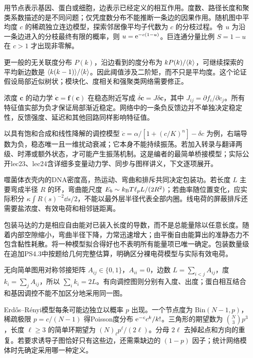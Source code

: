 用节点表示基因、蛋白或细胞，边表示已经定义的相互作用。度数、路径长度和聚类系数描述的是不同问题；仅凭度数分布不能推断一条边的因果作用。随机图中平均度 $c$ 的稀疏独立连边模型，探索邻居像平均子代数为 $c$ 的分枝过程。令 $u$ 为沿一条边进入的分枝最终有限的概率，则 $u=\mathrm e^{-c(1-u)}$。巨连通分量比例 $S=1-u$ 在 $c>1$ 才出现非零解。

更一般的无关联度分布 $P(k)$，沿边看到的度分布为 $kP(k)/\langle k\rangle$，可继续探索的平均新边数是 $\langle k(k-1)\rangle/\langle k\rangle$。因此阈值涉及二阶矩，而不只是平均度。这个论证假设局部近似树状；模块化、度相关和强聚类网络需要修正。

浓度 $\mathbf c$ 的动力学 $\dot{\mathbf c}=\mathbf f(\mathbf c)$ 在稳态附近写成 $\dot{\delta\mathbf c}=J\delta\mathbf c$，其中 $J_{ij}=\partial f_i/\partial c_j$。所有特征值实部为负才保证局部渐近稳定。网络中的一条负反馈边并不单独决定稳定性，反馈强度、延迟和其他回路同样影响特征值。

以具有饱和合成和线性降解的调控模型 $\dot c=\alpha/[1+(c/K)^n]-\delta c$ 为例，右端导数为负，稳态唯一且一维扰动衰减；它本身不能持续振荡。若加入转录与翻译两级、时滞或额外状态，才可能产生振荡机制。这是编者的最简单桥接模型；实际公开lec23、lec24含详细多变量动力学、同步与图样讲义，下文逐项展开。

噬菌体衣壳内的DNA密度高，热运动、弯曲和排斥共同决定包装功。若长度 $L$ 主要弯成半径 $R$ 的环，弯曲能尺度 $E_b\sim k_{\mathrm B} T\ell_pL/(2R^2)$；若曲率随位置变化，应实际积分 $\kappa\int R(s)^{-2}\dd s/2$，不能以最外层半径代表全部内圈。线电荷的屏蔽排斥还需要盐浓度、有效电荷和相邻链距离。

包装马达的力是相应自由能对已装入长度的导数，而不是总能量除以任意长度。随着内部空隙缩小，弯曲半径下降，力常迅速增大；由平衡自由能算出的准静态力不包含黏性耗散。将一种模型拟合得好也不表明所有能量项已唯一确定。包装数量级在追加PS4.3中按题给几何完整估算，明确区分裸电荷模型与实际有效电荷。

无向简单图用对称邻接矩阵 $A_{ij}\in\{0,1\}$，$A_{ii}=0$，边数 $L=\sum_{i<j}A_{ij}$，度 $k_i=\sum_jA_{ij}$，所以 $\sum_i k_i=2L$。有向调控图则分别有入度、出度；蛋白相互结合和基因调控不能不加区分地采用同一图。

Erd\H{o}s--R\'enyi模型每条可能边独立以概率 $p$ 出现。一个节点度为 $\mathrm{Bin}(N-1,p)$，稀疏极限 $p=c/(N-1)$ 得Poisson度分布 $\mathrm e^{-c}c^k/k!$。三角形的期望数为 $\binom N3p^3$，长度 $\ell\ge3$ 的简单环期望为 $(N)_\ell p^\ell/(2\ell)$。分母 $2\ell$ 去掉起点和方向的重复。若要求诱导子图恰好只有这些边，还需乘缺边的 $(1-p)$ 因子；统计网络模体时先确定采用哪一种定义。


